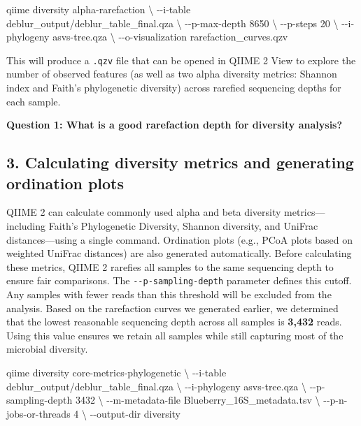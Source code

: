 \documentclass[
]{book}
\newenvironment{Shaded}{\begin{snugshade}}{\end{snugshade}}
\newcommand{\AttributeTok}[1]{\textcolor[rgb]{0.13,0.29,0.53}{#1}}
\newcommand{\DataTypeTok}[1]{\textcolor[rgb]{0.13,0.29,0.53}{#1}}
\newcommand{\ExtensionTok}[1]{#1}
\newcommand{\NormalTok}[1]{#1}
\begin{document}
\begin{Shaded}
\begin{Highlighting}[]
\ExtensionTok{qiime}\NormalTok{ diversity alpha{-}rarefaction }\DataTypeTok{\textbackslash{}}
  \AttributeTok{{-}{-}i{-}table}\NormalTok{ deblur\_output/deblur\_table\_final.qza }\DataTypeTok{\textbackslash{}}
  \AttributeTok{{-}{-}p{-}max{-}depth}\NormalTok{ 8650 }\DataTypeTok{\textbackslash{}}
  \AttributeTok{{-}{-}p{-}steps}\NormalTok{ 20 }\DataTypeTok{\textbackslash{}}
  \AttributeTok{{-}{-}i{-}phylogeny}\NormalTok{ asvs{-}tree.qza }\DataTypeTok{\textbackslash{}}
  \AttributeTok{{-}{-}o{-}visualization}\NormalTok{ rarefaction\_curves.qzv}
\end{Highlighting}
\end{Shaded}

This will produce a \texttt{.qzv} file that can be opened in QIIME 2 View to explore the number of observed features (as well as two alpha diversity metrics: Shannon index and Faith's phylogenetic diversity) across rarefied sequencing depths for each sample.

\textbf{Question 1: What is a good rarefaction depth for diversity analysis?}

\subsection{3. Calculating diversity metrics and generating ordination plots}\label{diversity-ordination}

QIIME 2 can calculate commonly used alpha and beta diversity metrics---including Faith's Phylogenetic Diversity, Shannon diversity, and UniFrac distances---using a single command. Ordination plots (e.g., PCoA plots based on weighted UniFrac distances) are also generated automatically. Before calculating these metrics, QIIME 2 rarefies all samples to the same sequencing depth to ensure fair comparisons. The \texttt{-\/-p-sampling-depth} parameter defines this cutoff. Any samples with fewer reads than this threshold will be excluded from the analysis. Based on the rarefaction curves we generated earlier, we determined that the lowest reasonable sequencing depth across all samples is \textbf{3,432} reads. Using this value ensures we retain all samples while still capturing most of the microbial diversity.

\begin{Shaded}
\begin{Highlighting}[]
\ExtensionTok{qiime}\NormalTok{ diversity core{-}metrics{-}phylogenetic }\DataTypeTok{\textbackslash{}}
  \AttributeTok{{-}{-}i{-}table}\NormalTok{ deblur\_output/deblur\_table\_final.qza }\DataTypeTok{\textbackslash{}}
  \AttributeTok{{-}{-}i{-}phylogeny}\NormalTok{ asvs{-}tree.qza }\DataTypeTok{\textbackslash{}}
  \AttributeTok{{-}{-}p{-}sampling{-}depth}\NormalTok{ 3432  }\DataTypeTok{\textbackslash{}}
  \AttributeTok{{-}{-}m{-}metadata{-}file}\NormalTok{ Blueberry\_16S\_metadata.tsv }\DataTypeTok{\textbackslash{}}
  \AttributeTok{{-}{-}p{-}n{-}jobs{-}or{-}threads}\NormalTok{ 4 }\DataTypeTok{\textbackslash{}}
  \AttributeTok{{-}{-}output{-}dir}\NormalTok{ diversity}
\end{Highlighting}
\end{Shaded}
\end{document}
